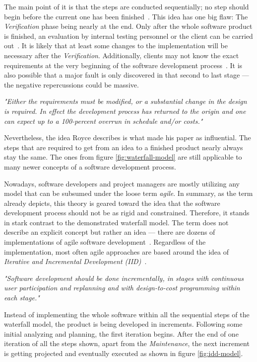 \documentclass[12pt,a4paper,twoside]{report}
\begin{document}
The main point of it is that the steps are conducted sequentially;
no step should begin before the current one has been finished~\cite{boehm-spiral}.
This idea has one big flaw: The \textit{Verification} phase being nearly at the end.
Only after the whole software product is finished, an evaluation by
internal testing personnel or the client can be carried out~\cite{royce-large-systems}.
It is likely that at least some changes to the implementation will be necessary after the \textit{Verification}.
Additionally, clients may not know the exact requirements at the very beginning
of the software development process~\cite{parnas-rational-design-process}.
It is also possible that a major fault is only discovered in that second to last stage ---
the negative repercussions could be massive.
\begin{displayquote}
\emph{"Either the requirements must be modified, or a substantial change
in the design is required. In effect the development process has returned to
the origin and one can expect up to a 100-percent overrun
in schedule and/or costs."}~\cite{royce-large-systems}
\end{displayquote}
Nevertheless, the idea Royce describes is what made his paper as influential.
The steps that are required to get from an idea to a finished product nearly always
stay the same. The ones from figure \ref{fig:waterfall-model} are still applicable to
many newer concepts of a software development process.

Nowadays, software developers and project managers are mostly utilizing any model that
can be subsumed under the loose term \textit{agile}.
In summary, as the term already depicts, this theory is geared toward
the idea that the software development process should not be as rigid and constrained.
Therefore, it stands in stark contrast to the demonstrated waterfall model.
The term does not describe an explicit concept but rather an idea ---
there are dozens of implementations of agile software development~\cite{martin-agile-practices}.
Regardless of the implementation, most often agile approaches are based around
the idea of \textit{Iterative and Incremental Development (IID)}~\cite{larman-iid-history}.
\begin{displayquote}
\emph{"Software development should be done incrementally, in stages with
continuous user participation and replanning and
with design-to-cost programming within each stage."}~\cite{mills-iid}
\end{displayquote}
Instead of implementing the whole software within all the sequential steps
of the waterfall model, the product is being developed in increments.
Following some initial analyzing and planning, the first iteration begins.
After the end of one iteration of all the steps shown, apart from the \textit{Maintenance},
the next increment is getting projected and eventually executed as shown in figure \ref{fig:idd-model}.
\end{document}
